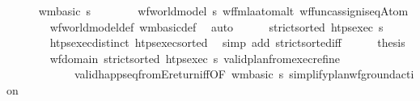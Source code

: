 \begin{isabellebody}
\ \ \ \ \isamarkupfalse%
\ {\isachardoublequoteopen}wm{\isacharunderscore}{\kern0pt}basic\ s{\isachardoublequoteclose}\isanewline
\ \ \ \ \ \ \isamarkupfalse%
\ {\isacartoucheopen}wf{\isacharunderscore}{\kern0pt}world{\isacharunderscore}{\kern0pt}model\ s{\isacartoucheclose}\ wf{\isacharunderscore}{\kern0pt}fmla{\isacharunderscore}{\kern0pt}atom{\isacharunderscore}{\kern0pt}alt\ wf{\isacharunderscore}{\kern0pt}func{\isacharunderscore}{\kern0pt}assign{\isacharunderscore}{\kern0pt}is{\isacharunderscore}{\kern0pt}eqAtom\ \isanewline
\ \ \ \ \ \ \isamarkupfalse%
\ wf{\isacharunderscore}{\kern0pt}world{\isacharunderscore}{\kern0pt}model{\isacharunderscore}{\kern0pt}def\ wm{\isacharunderscore}{\kern0pt}basic{\isacharunderscore}{\kern0pt}def\ \isamarkupfalse%
\ auto\isanewline
\ \ \ \ \isamarkupfalse%
\ {\isachardoublequoteopen}strict{\isacharunderscore}{\kern0pt}sorted\ {\isacharparenleft}{\kern0pt}htps{\isacharunderscore}{\kern0pt}exec\ {\isasympi}s{\isacharparenright}{\kern0pt}{\isachardoublequoteclose}\isanewline
\ \ \ \ \ \ \isamarkupfalse%
\ htps{\isacharunderscore}{\kern0pt}exec{\isacharunderscore}{\kern0pt}distinct\ htps{\isacharunderscore}{\kern0pt}exec{\isacharunderscore}{\kern0pt}sorted\ \isamarkupfalse%
\ {\isacharparenleft}{\kern0pt}simp\ add{\isacharcolon}{\kern0pt}\ strict{\isacharunderscore}{\kern0pt}sorted{\isacharunderscore}{\kern0pt}iff{\isacharparenright}{\kern0pt}\isanewline
\ \ \ \ \isamarkupfalse%
\ {\isacharquery}{\kern0pt}thesis\isanewline
\ \ \ \ \ \ \isamarkupfalse%
\ {\isacartoucheopen}wf{\isacharunderscore}{\kern0pt}domain{\isacartoucheclose}\ {\isacartoucheopen}strict{\isacharunderscore}{\kern0pt}sorted\ {\isacharparenleft}{\kern0pt}htps{\isacharunderscore}{\kern0pt}exec\ {\isasympi}s{\isacharparenright}{\kern0pt}{\isacartoucheclose}\ valid{\isacharunderscore}{\kern0pt}plan{\isacharunderscore}{\kern0pt}from{}{\isacharunderscore}{\kern0pt}exec{\isacharunderscore}{\kern0pt}refine\isanewline
\ \ \ \ \ \ \ \ \ \ \ \ valid{\isacharunderscore}{\kern0pt}happ{\isacharunderscore}{\kern0pt}seq{\isacharunderscore}{\kern0pt}fromE{\isacharunderscore}{\kern0pt}return{\isacharunderscore}{\kern0pt}iff{\isacharbrackleft}{\kern0pt}OF\ {\isacartoucheopen}wm{\isacharunderscore}{\kern0pt}basic\ s{\isacartoucheclose}\ simplify{\isacharunderscore}{\kern0pt}plan{\isacharunderscore}{\kern0pt}wf{\isacharunderscore}{\kern0pt}ground{\isacharunderscore}{\kern0pt}action{\isacharbrackright}{\kern0pt}\ \isanewline

\end{isabellebody}
